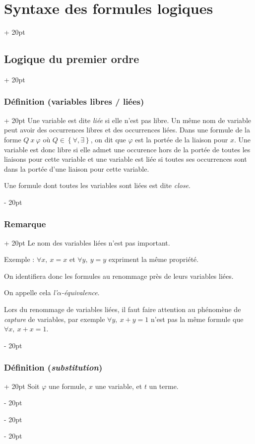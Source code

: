 \documentclass[a4paper, 12pt, twoside]{article}
\newcommand{\set}[1]{\left\{ #1 \right\}}
\newcommand{\ind}[1][20pt]{\advance\leftskip + #1}
\newcommand{\deind}[1][20pt]{\advance\leftskip - #1}
\newenvironment{indt}[2][20pt]{#2 \par \ind[#1]}{\par \deind} %
\begin{document}
\begin{indt}{\section{Syntaxe des formules logiques}}
\begin{indt}{\subsection{Logique du premier ordre}}
\begin{indt}{\subsubsection{Définition (variables libres / liées)}}
                Une variable est dite \textit{liée} si elle n'est pas libre. Un même nom de variable peut avoir des occurrences libres et des occurrences liées. Dans une formule de la forme $Q\ x\ \varphi$ où $Q \in \set{\forall, \exists}$, on dit que $\varphi$ est la portée de la liaison pour $x$. Une variable est donc libre si elle admet une occurence hors de la portée de toutes les liaisons pour cette variable et une variable est liée si toutes ses occurrences sont dans la portée d'une liaison pour cette variable.
                
                Une formule dont toutes les variables sont liées est dite \textit{close}.
            \end{indt}
            
            \vspace{12pt}
            
            \begin{indt}{\subsubsection{Remarque}}
                Le nom des variables liées n'est pas important.
                
                Exemple : $\forall x,\ x = x$ et $\forall y,\ y = y$ expriment la même propriété.
                
                On identifiera donc les formules au renommage près de leurs variables liées.
                
                On appelle cela \textit{l'$\alpha$-équivalence}.
                
                Lors du renommage de variables liées, il faut faire attention au phénomène de \textit{capture} de variables, par exemple $\forall y,\ x + y = 1$ n'est pas la même formule que $\forall x,\ x + x = 1$.
            \end{indt}
            
            \vspace{12pt}
            
            \begin{indt}{\subsubsection{Définition (\textit{substitution})}}
                Soit $\varphi$ une formule, $x$ une variable, et $t$ un terme.
                

\end{indt}
\end{indt}
\end{indt}
\end{document}
